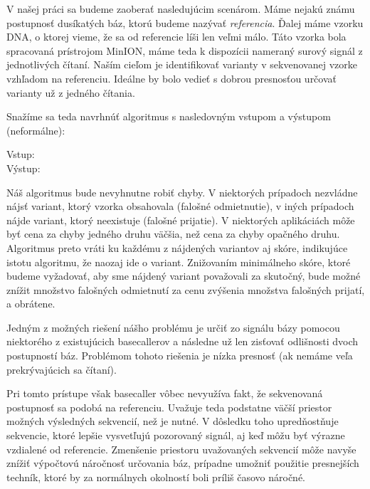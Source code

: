 V našej práci sa budeme zaoberať nasledujúcim scenárom. Máme nejakú známu postupnosť
dusíkatých báz, ktorú budeme nazývať \emph{referencia}. Ďalej máme vzorku DNA, o ktorej vieme,
že sa od referencie líši len veľmi málo. Táto vzorka bola spracovaná prístrojom MinION, máme teda k dispozícii
nameraný surový signál z jednotlivých čítaní. Naším cieľom je identifikovať varianty v sekvenovanej
vzorke vzhľadom na referenciu. Ideálne by bolo vedieť s dobrou presnosťou určovať varianty už z jedného čítania.

Snažíme sa teda navrhnúť algoritmus s nasledovným vstupom a výstupom (neformálne):

\begin{description}

\item[Vstup:] 

\item[Výstup:] 
\end{description}

Náš algoritmus bude nevyhnutne robiť chyby. V niektorých prípadoch nezvládne nájsť variant, ktorý vzorka
obsahovala (falošné odmietnutie), v iných prípadoch nájde variant, ktorý neexistuje (falošné prijatie). 
V niektorých aplikáciách môže byť cena za chyby jedného druhu väčšia, než cena za chyby opačného 
druhu. Algoritmus preto vráti ku každému z nájdených variantov aj skóre, indikujúce istotu algoritmu, že 
naozaj ide o variant. Znižovaním minimálneho skóre, ktoré budeme vyžadovať, aby sme nájdený variant 
považovali za skutočný, bude možné znížit množstvo falošných odmietnutí za cenu zvýšenia množstva 
falošných prijatí, a obrátene.


Jedným z možných riešení nášho problému je určiť zo signálu bázy pomocou niektorého z existujúcich 
basecallerov a následne už len zisťovať odlišnosti dvoch postupností báz. Problémom tohoto riešenia
je nízka presnosť (ak nemáme veľa prekrývajúcich sa čítaní). 

Pri tomto prístupe však basecaller vôbec
nevyužíva fakt, že sekvenovaná postupnosť sa podobá na referenciu. Uvažuje teda podstatne väčší 
priestor možných výsledných sekvencií, než je nutné. V dôsledku toho upredňostňuje sekvencie, ktoré 
lepšie vysvetľujú pozorovaný signál, aj keď môžu byť výrazne vzdialené od referencie.
Zmenšenie priestoru uvažovaných sekvencií môže navyše znížiť výpočtovú náročnosť určovania báz, prípadne
umožniť použitie presnejších techník, ktoré by za normálnych okolností boli príliš časovo náročné.
